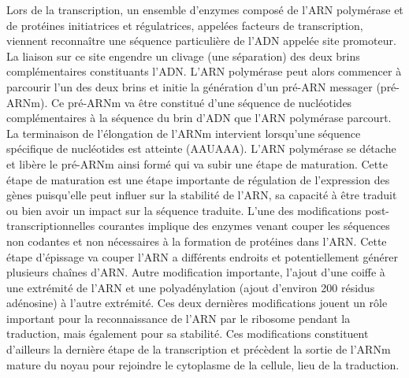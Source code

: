 



Lors de la transcription, un ensemble d'enzymes composé de l'ARN polymérase et de protéines initiatrices et régulatrices, appelées facteurs de transcription, viennent reconnaître une séquence particulière de l'ADN appelée site promoteur. La liaison sur ce site engendre un clivage (une séparation) des deux brins complémentaires constituants l'ADN. 
L'ARN polymérase peut alors commencer à parcourir l'un des deux brins et initie la génération d'un pré-ARN messager (pré-ARNm). Ce pré-ARNm va être constitué d'une séquence de nucléotides complémentaires à la séquence du brin d'ADN que l'ARN polymérase parcourt. La terminaison de l'élongation de l'ARNm intervient lorsqu’une séquence spécifique de nucléotides est atteinte (AAUAAA). 
L'ARN polymérase se détache et libère le pré-ARNm ainsi formé qui va subir une étape de maturation. Cette étape de maturation est une étape importante de régulation de l'expression des gènes puisqu'elle peut influer sur la stabilité de l'ARN, sa capacité à être traduit ou bien avoir un impact sur la séquence traduite. 
L'une des modifications post-transcriptionnelles courantes implique des enzymes venant couper les séquences non codantes et non nécessaires à la formation de protéines dans l'ARN. Cette étape d'épissage va couper l'ARN a différents endroits et potentiellement générer plusieurs chaînes d'ARN. Autre modification importante, l'ajout d'une coiffe à une extrémité de l'ARN et une polyadénylation (ajout d'environ 200 résidus adénosine) à l'autre extrémité. Ces deux dernières modifications jouent un rôle important pour la reconnaissance de l'ARN par le ribosome pendant la traduction, mais également pour sa stabilité. Ces modifications constituent d'ailleurs la dernière étape de la transcription et précèdent la sortie de l'ARNm mature du noyau pour rejoindre le cytoplasme de la cellule, lieu de la traduction.

